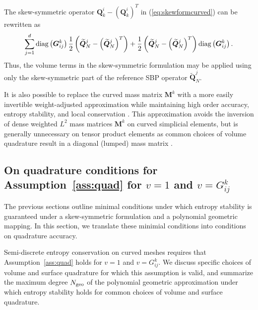 \documentclass{svjour3}                     %
\renewcommand{\tilde}{\widetilde}
\newcommand{\diag}[1]{{\rm diag}\LRp{#1}}
\newcommand{\LRp}[1]{\left( #1 \right)}
\renewcommand{\note}[1]{{\color{blue}{#1}}}
\begin{document}
\begin{remark}
The skew-symmetric operator ${\bm{Q}^i_k - \LRp{\bm{Q}^i_k}^T}$ in (\ref{eq:skewformcurved}) can be rewritten as
\begin{align*}
\sum_{j=1}^d \diag{\bm{G}^k_{ij}}{ \frac{1}{2}\LRp{\tilde{\bm{Q}}_N^j-\LRp{\tilde{\bm{Q}}_N^j}^T}}+  \frac{1}{2} \LRp{\tilde{\bm{Q}}_N^j-\LRp{\tilde{\bm{Q}}_N^j}^T}\diag{\bm{G}^k_{ij}}.
\end{align*}
Thus, the volume terms in the skew-symmetric formulation may be applied using only the skew-symmetric part of the reference SBP operator $\tilde{\bm{Q}}^j_N$.
\end{remark}

\begin{remark}
It is also possible to replace the curved mass matrix $\bm{M}^k$ with a more easily invertible weight-adjusted approximation while maintaining high order accuracy, entropy stability, and local conservation \cite{chan2018discretely}.  This approximation avoids the inversion of dense weighted $L^2$ mass matrices $\bm{M}^k$ on curved simplicial elements, but is generally unnecessary on tensor product elements as common choices of volume quadrature result in a diagonal (lumped) mass matrix \cite{carpenter2014entropy, parsani2016entropy, chan2018efficient}.
\end{remark}

\subsection{On quadrature conditions for Assumption~\ref{ass:quad} for $v = 1$ and $v = G^k_{ij}$}
\label{sec:quadacc}



The previous sections outline minimal conditions under which entropy stability is guaranteed under a skew-symmetric formulation and a polynomial geometric mapping.  In this section, we translate these minimial conditions into conditions on quadrature accuracy.  

Semi-discrete entropy conservation on curved meshes requires that Assumption~\ref{ass:quad} holds for $v = 1$ and $v = G^k_{ij}$.  We discuss specific choices of volume and surface quadrature for which this assumption is valid, and summarize the maximum degree $N_{\rm geo}$ of the polynomial geometric approximation under which entropy stability holds for common choices of volume and surface quadrature.  
\end{document}
